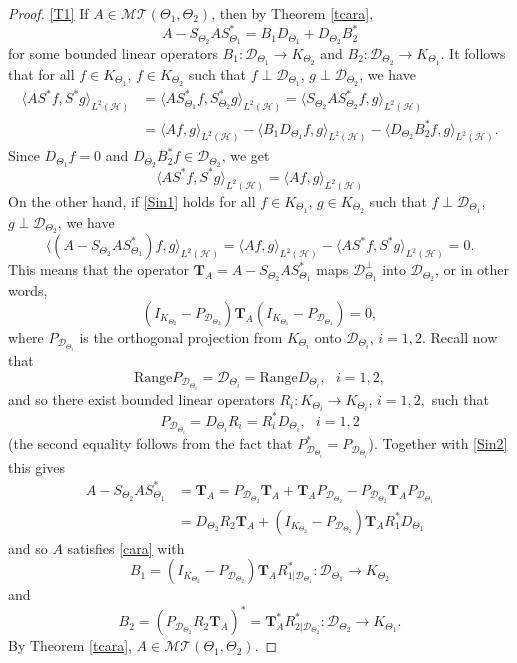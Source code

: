 \documentclass[10pt,a4paper]{amsart}
\newcommand{\T}{{\mathbf{T}}}
\newcommand{\hsp}{\mathcal{H}}
\begin{document}
\begin{proof}
\eqref{T1} If $A\in \mathcal{MT}(\Theta_1, \Theta_2)$, then by Theorem \ref{tcara},
$$A-S_{\Theta_2}AS_{\Theta_1}^*=B_1D_{\Theta_1}+D_{\Theta_2}B_2^*$$
for some bounded linear operators $B_1: \mathcal{D}_{\Theta_1}\to K_{\Theta_2}$ and $B_2: \mathcal{D}_{\Theta_2}\to K_{\Theta_1}$. It follows that for all $f\in K_{\Theta_1}$, $f\in K_{\Theta_2}$ such that $f\perp\mathcal{D}_{\Theta_1}$, $g\perp\mathcal{D}_{\Theta_2}$, we have
\begin{align*}
\langle AS^*f, S^*g\rangle_{L^2(\hsp)}
&=\langle A S^*_{\Theta_1}f,S^*_{\Theta_2}g\rangle_{L^2(\hsp)}=\langle  S_{\Theta_2}AS^*_{\Theta_2}f, g\rangle_{L^2(\hsp)}\\
&=\langle Af, g\rangle_{L^2(\hsp)}-\langle B_1D_{\Theta_1}f,g\rangle_{L^2(\hsp)}-\langle D_{\Theta_2}B_2^*f,g\rangle_{L^2(\hsp)}.
\end{align*}
Since $D_{\Theta_1}f=0$ and $D_{\Theta_2}B_2^*f\in \mathcal{D}_{\Theta_2}$, we get
\begin{equation}\label{Sin1}
\langle AS^*f, S^*g\rangle_{L^2(\hsp)}=\langle A f,g\rangle_{L^2(\hsp)}
\end{equation}
On the other hand, if \eqref{Sin1} holds for all $f\in K_{\Theta_1}$, $g\in K_{\Theta_2}$ such that $f\perp \mathcal{D}_{\Theta_1}$, $g\perp \mathcal{D}_{\Theta_2}$, we have
$$\langle (A-S_{\Theta_2}AS_{\Theta_1}^*)f,g\rangle_{L^2(\hsp)}=\langle Af,g\rangle_{L^2(\hsp)}- \langle AS^*f,S^*g\rangle_{L^2(\hsp)}=0.$$
This means that the operator $\T_A=A-S_{\Theta_2}AS_{\Theta_1}^*$ maps $\mathcal{D}^{\perp}_{\Theta_1}$ into $\mathcal{D}_{\Theta_2}$, or in other words,
\begin{equation}\label{Sin2}
(I_{K_{\Theta_2}}-P_{\mathcal{D}_{\Theta_2}})\T_A(I_{K_{\Theta_1}}-P_{\mathcal{D}_{\Theta_1}})=0,
\end{equation}
where $P_{\mathcal{D}_{\Theta_i}}$ is the orthogonal projection from $K_{\Theta_i}$ onto $\mathcal{D}_{\Theta_i}$, $i=1,2$.
Recall now that
$$\text{Range}P_{\mathcal{D}_{\Theta_i}}=\mathcal{D}_{\Theta_i}=\text{Range}D_{\Theta_i},~~~ i=1,2,$$
and so there exist bounded linear operators $R_i: K_{\Theta_i}\to K_{\Theta_i}$, $i=1,2,$ such that
$$P_{\mathcal{D}_{\Theta_i}}=D_{\Theta_i}R_i=R_i^*D_{\Theta_i}, ~~~ i=1,2$$
(the second equality follows from the fact that $P_{\mathcal{D}_{\Theta_i}}^*=P_{\mathcal{D}_{\Theta_i}}$). Together with \eqref{Sin2} this gives
\begin{align*}
A-S_{\Theta_2}AS_{\Theta_1}^*
&=\T_A=P_{\mathcal{D}_{\Theta_2}}\T_A+\T_AP_{\mathcal{D}_{\Theta_2}}-P_{\mathcal{D}_{\Theta_2}}\T_AP_{\mathcal{D}_{\Theta_1}}\\
&=D_{\Theta_2}R_2\T_A+(I_{K_{\Theta_2}}-P_{\mathcal{D}_{\Theta_2}})\T_AR_1^*D_{\Theta_1}
\end{align*}
and so $A$ satisfies \eqref{cara} with
$$B_1=(I_{K_{\Theta_2}}-P_{\mathcal{D}_{\Theta_2}})
\T_AR^*_{1|\mathcal{D}_{\Theta_1}}:
\mathcal{D}_{\Theta_1}\to K_{\Theta_2}$$
and
$$B_2=(P_{\mathcal{D}_{\Theta_2}}R_2\T_A)^*=\T_A^*R^*_{2|\mathcal{D}_{\Theta_2}}:\mathcal{D}_{\Theta_2}\to K_{\Theta_1}.$$
By Theorem \ref{tcara}, $A\in \mathcal{MT}(\Theta_1, \Theta_2)$.


\end{proof}
\end{document}
